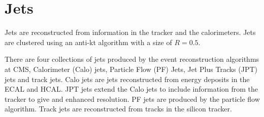 \section{Jets}
Jets are reconstructed from information in the tracker and the calorimeters.
Jets are clustered using an anti-kt algorithm  with a size of
$R=0.5$.

There are four collections of jets produced by the event reconstruction
algorithms at CMS, Calorimeter (Calo) jets, Particle Flow (PF) Jets, Jet Plus
Tracks (JPT) jets and track jets. Calo jets are jets reconstructed from energy
deposits in the ECAL and HCAL. JPT jets extend the Calo jets to include
information from the tracker to give and enhanced \pT resolution. PF jets are
produced by the particle flow algorithm\cite{PF}. Track jets are reconstructed from
tracks in the silicon tracker.

